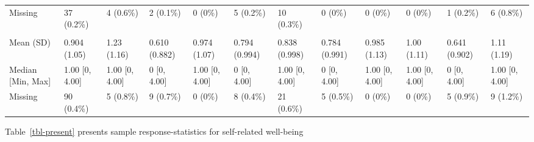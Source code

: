 \documentclass[
  single column]{article}
\begin{document}
\begin{landscape}
\begin{longtable}[t]{llllllllllll}
\hspace{1em}Missing & 37 (0.2\%) & 4 (0.6\%) & 2 (0.1\%) & 0 (0\%) & 5 (0.2\%) & 10 (0.3\%) & 0 (0\%) & 0 (0\%) & 0 (0\%) & 1 (0.2\%) & 6 (0.8\%)\\
\addlinespace[0.3em]
\multicolumn{12}{l}{\textbf{Rumination}}\\
\hspace{1em}Mean (SD) & 0.904 (1.05) & 1.23 (1.16) & 0.610 (0.882) & 0.974 (1.07) & 0.794 (0.994) & 0.838 (0.998) & 0.784 (0.991) & 0.985 (1.13) & 1.00 (1.11) & 0.641 (0.902) & 1.11 (1.19)\\
\hspace{1em}Median [Min, Max] & 1.00 [0, 4.00] & 1.00 [0, 4.00] & 0 [0, 4.00] & 1.00 [0, 4.00] & 0 [0, 4.00] & 1.00 [0, 4.00] & 0 [0, 4.00] & 1.00 [0, 4.00] & 1.00 [0, 4.00] & 0 [0, 4.00] & 1.00 [0, 4.00]\\
\hspace{1em}Missing & 90 (0.4\%) & 5 (0.8\%) & 9 (0.7\%) & 0 (0\%) & 8 (0.4\%) & 21 (0.6\%) & 5 (0.5\%) & 0 (0\%) & 0 (0\%) & 5 (0.9\%) & 9 (1.2\%)\\*

\end{longtable}

\endgroup{}


\end{landscape}

\newpage{}

Table~\ref{tbl-present} presents sample response-statistics for
self-related well-being
\end{document}
